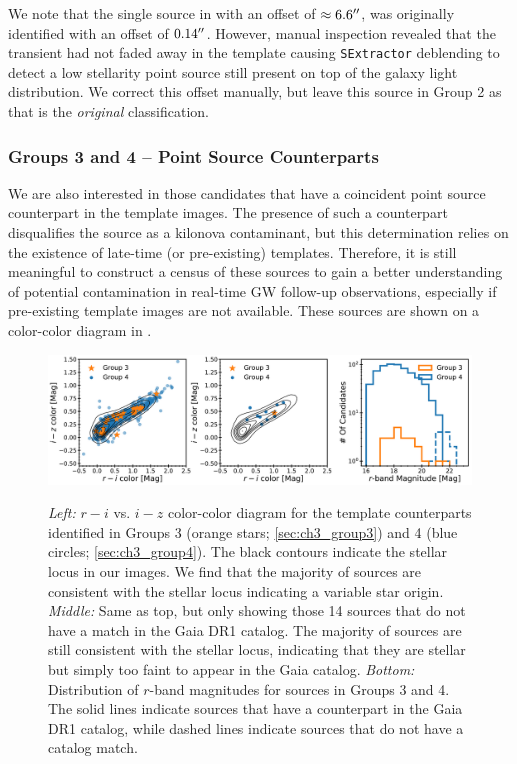 We note that the single source in  with an offset of $\approx6.6\hbox{$^{\prime\prime}$}$, was originally identified with an offset of $0.14\hbox{$^{\prime\prime}$}$. However, manual inspection revealed that the transient had not faded away in the template causing {\tt SExtractor} deblending to detect a low stellarity point source still present on top of the galaxy light distribution. We correct this offset manually, but leave this source in Group 2 as that is the {\it original} classification.

\clearpage
\subsubsection{Groups 3 and 4 -- Point Source Counterparts}
\label{sec:ch3_pointsources}
We are also interested in those candidates that have a coincident point source counterpart in the template images. The presence of such a counterpart disqualifies the source as a kilonova contaminant, but this determination relies on the existence of late-time (or pre-existing) templates.  Therefore, it is still meaningful to construct a census of these sources to gain a better understanding of potential contamination in real-time GW follow-up observations, especially if pre-existing template images are not available. These sources are shown on a color-color diagram in .

\begin{figure}[!t]
\begin{center}
\hspace*{-0.1in}
\scalebox{1.}
{\includegraphics[width=\textwidth]{./figs/chapter3/f2alt.pdf}}
\caption{{\it Left:} $r-i$ vs. $i-z$ color-color diagram for the template counterparts identified in Groups 3 (orange stars; \cref{sec:ch3_group3}) and 4 (blue circles; \cref{sec:ch3_group4}). The black contours indicate the stellar locus in our images. We find that the majority of sources are consistent with the stellar locus indicating a variable star origin.
{\it Middle:} Same as top, but only showing those 14 sources that do not have a match in the Gaia DR1 catalog. The majority of sources are still consistent with the stellar locus, indicating that they are stellar but simply too faint to appear in the Gaia catalog.
{\it Bottom:} Distribution of $r$-band magnitudes for sources in Groups 3 and 4. The solid lines indicate sources that have a counterpart in the Gaia DR1 catalog, while dashed lines indicate sources that do not have a catalog match.}
\label{fig:ch3_color_color}
\end{center}
\end{figure}

